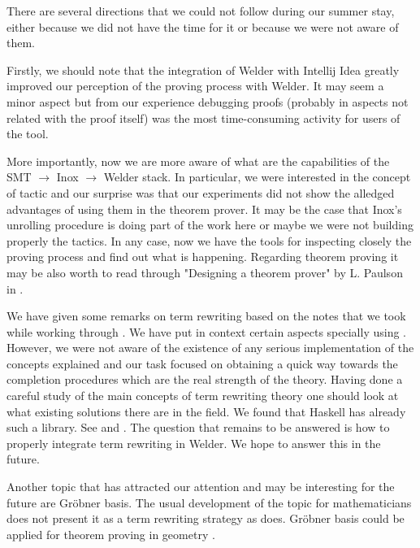 There are several directions that we could not follow during our summer stay, either because we did not have the time for it or because we were not aware of them.

Firstly, we should note that the integration of Welder with Intellij Idea greatly improved our perception of the proving process with Welder. It may seem a minor aspect but from our experience debugging proofs (probably in aspects not related with the proof itself) was the most time-consuming activity for users of the tool. 

More importantly, now we are more aware of what are the capabilities of the SMT $\to$ Inox $\to$ Welder stack. In particular, we were interested in the concept of tactic and our surprise was that our experiments did not show the alledged advantages of using them in the theorem prover. It may be the case that Inox's unrolling procedure is doing part of the work here or maybe we were not building properly the tactics. In any case, now we have the tools for inspecting closely the proving process and find out what is happening. Regarding theorem proving it may be also worth to read through "Designing a theorem prover" by L. Paulson in \cite{handbook}.

We have given some remarks on term rewriting based on the notes that we took while working through \cite{term-rewriting}. We have put in context certain aspects specially using \cite{handbook}. However, we were not aware of the existence of any serious implementation of the concepts explained and our task focused on obtaining a quick way towards the completion procedures which are the real strength of the theory. Having done a careful study of the main concepts of term rewriting theory one should look at what existing solutions there are in the field. We found that Haskell has already such a library. See \cite{haskell1} and \cite{haskell2}. The question that remains to be answered is how to properly integrate term rewriting in Welder. We hope to answer this in the future. 

Another topic that has attracted our attention and may be interesting for the future are Gr\"obner basis. The usual development of the topic \cite{ideals} for mathematicians does not present it as a term rewriting strategy as \cite{term-rewriting} does. Gr\"obner basis could be applied for theorem proving in geometry \cite{groebner}.




